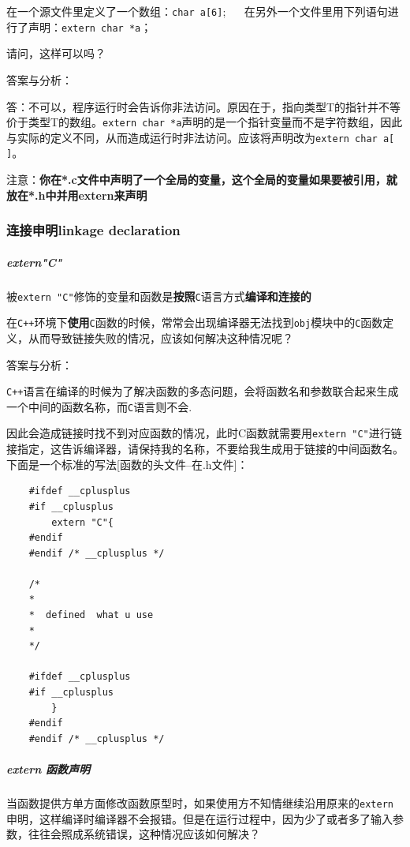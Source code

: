 \documentclass[UTF8,a4paper,12pt]{ctexbook} %
\begin{document}
		        在一个源文件里定义了一个数组：\verb|char a[6]|;
		        　
		        在另外一个文件里用下列语句进行了声明：\verb|extern char *a|；
		        
		        请问，这样可以吗？ 
		        
		        答案与分析：
		        
		        答：不可以，程序运行时会告诉你非法访问。原因在于，指向类型T的指针并不等价于类型T的数组。\verb|extern char *a|声明的是一个指针变量而不是字符数组，因此与实际的定义不同，从而造成运行时非法访问。应该将声明改为\verb|extern char a[ ]|。
		        
		        注意：{\color{blue}\textbf{你在*.c文件中声明了一个全局的变量，这个全局的变量如果要被引用，就放在*.h中并用extern来声明}}
		        
	      \subsubsection{连接申明linkage declaration}        
	        \subparagraph{extern"C"}
		        被\verb|extern "C"|修饰的变量和函数是\textbf{按照}\verb|C|语言方式\textbf{编译和连接的}
		        
		        在\verb|C++|环境下\textbf{使用}\verb|C|函数的时候，常常会出现编译器无法找到\verb|obj|模块中的\verb|C|函数定义，从而导致链接失败的情况，应该如何解决这种情况呢？
	        
		        答案与分析：
		        
		        \verb|C++|语言在编译的时候为了解决函数的多态问题，会将函数名和参数联合起来生成一个中间的函数名称，而\verb|C|语言则不会.
		        
		        因此会造成链接时找不到对应函数的情况，此时C函数就需要用\verb|extern "C"|进行链接指定，这告诉编译器，请保持我的名称，不要给我生成用于链接的中间函数名。
		        下面是一个标准的写法[函数的头文件--在.h文件]：
		        \begin{lstlisting}
	#ifdef __cplusplus
	#if __cplusplus
		extern "C"{
	#endif
	#endif /* __cplusplus */ 
	
	/*
	*
	*  defined  what u use
	*
	*/
	
	#ifdef __cplusplus
	#if __cplusplus
		}
	#endif
	#endif /* __cplusplus */ 	        
		        \end{lstlisting}
        
	        \subparagraph{extern 函数声明} 当函数提供方单方面修改函数原型时，如果使用方不知情继续沿用原来的\verb|extern|申明，这样编译时编译器不会报错。但是在运行过程中，因为少了或者多了输入参数，往往会照成系统错误，这种情况应该如何解决？
	        
\end{document}
